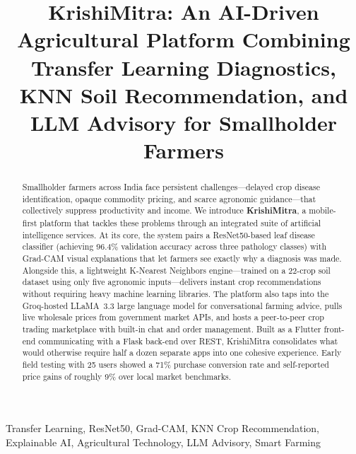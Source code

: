 \documentclass[conference]{IEEEtran}
\begin{document}
\title{KrishiMitra: An AI-Driven Agricultural Platform Combining Transfer Learning Diagnostics, KNN
Soil Recommendation, and LLM Advisory for Smallholder Farmers}

\author{
}

\maketitle

\begin{abstract}
Smallholder farmers across India face persistent challenges---delayed crop disease identification,
opaque commodity pricing, and scarce agronomic guidance---that collectively suppress productivity
and income. We introduce \textbf{KrishiMitra}, a mobile-first platform that tackles these problems
through an integrated suite of artificial intelligence services. At its core, the system pairs a
ResNet50-based leaf disease classifier (achieving 96.4\% validation accuracy across three pathology
classes) with Grad-CAM visual explanations that let farmers see exactly why a diagnosis was made.
Alongside this, a lightweight K-Nearest Neighbors engine---trained on a 22-crop soil dataset using
only five agronomic inputs---delivers instant crop recommendations without requiring heavy machine
learning libraries. The platform also taps into the Groq-hosted LLaMA~3.3 large language model for
conversational farming advice, pulls live wholesale prices from government market APIs, and hosts a
peer-to-peer crop trading marketplace with built-in chat and order management. Built as a Flutter
front-end communicating with a Flask back-end over REST, KrishiMitra consolidates what would
otherwise require half a dozen separate apps into one cohesive experience. Early field testing with
25 users showed a 71\% purchase conversion rate and self-reported price gains of roughly 9\% over
local market benchmarks.
\end{abstract}

\begin{IEEEkeywords}
Transfer Learning, ResNet50, Grad-CAM, KNN Crop Recommendation, Explainable AI, Agricultural
Technology, LLM Advisory, Smart Farming
\end{IEEEkeywords}
\end{document}
